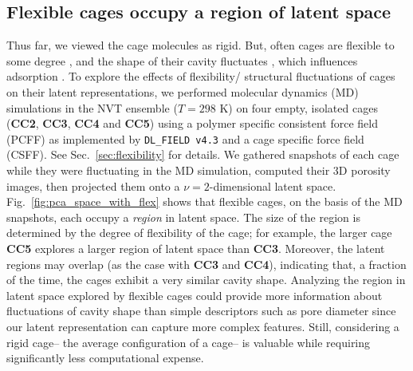 \documentclass[journal=jacsat,manuscript=article,layout=traditional]{achemso}
\begin{document}
\subsection{\color{red} Flexible cages occupy a region of latent space}
\label{sec:flexible_MD}
{\color{red}Thus far, we viewed the cage molecules as rigid. But, often cages are flexible to some degree \cite{chen2014separation,camp2016transition,holden2014gas,holden2016understanding}, and the shape of their cavity fluctuates \cite{chen2014separation}, which influences adsorption \cite{witman2017influence}.
To explore the effects of flexibility/ structural fluctuations of cages on their latent representations, we performed molecular dynamics (MD) simulations in the NVT ensemble ($T=298$ K) on four empty, isolated cages (\textbf{CC2}, \textbf{CC3}, \textbf{CC4} and \textbf{CC5}) using a polymer specific consistent force field (PCFF) \cite{sun1994ab,sun1994force,sun1995ab} as implemented by \texttt{DL\_FIELD v4.3} \cite{Yong2016dlfield} and a cage specific force field (CSFF)\cite{holden2012bespoke}. See Sec.~\ref{sec:flexibility} for details. We gathered snapshots of each cage while they were fluctuating in the MD simulation, computed their 3D porosity images, then projected them onto a $\nu=2$-dimensional latent space. Fig.~\ref{fig:pca_space_with_flex} shows that flexible cages, on the basis of the MD snapshots, each occupy a \emph{region} in latent space. The size of the region is determined by the degree of flexibility of the cage; for example, the larger cage \textbf{CC5} explores a larger region of latent space than \textbf{CC3}. Moreover, the latent regions may overlap (as the case with \textbf{CC3} and \textbf{CC4}), indicating that, a fraction of the time, the cages exhibit a very similar cavity shape. 
Analyzing the region in latent space explored by flexible cages could provide more information about fluctuations of cavity shape than simple descriptors such as pore diameter since our latent representation can capture more complex features. Still, considering a rigid cage-- the average configuration of a cage-- is valuable while requiring significantly less computational expense.
}
\end{document}
